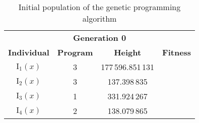 \begin{table}[ht!]
  \centering
  \begin{tabular}{c|c|c|r}
    \multicolumn{4}{c}{\textbf{Generation 0}}	\\
    \textbf{Individual} & \textbf{Program} & \textbf{Height} & \textbf{Fitness}	\\
    $\mathrm{I}_1(x)$ & 3 & 177\,596.851\,131	\\
    $\mathrm{I}_2(x)$ & 3 & 137.398\,835	\\
    $\mathrm{I}_3(x)$ & 1 & 331.924\,267	\\
    $\mathrm{I}_4(x)$ & 2 & 138.079\,865	\\
  \end{tabular}
  \caption{Initial population of the genetic programming algorithm}
  \label{tab:bg:gp:sym:init:pop}
\end{table}